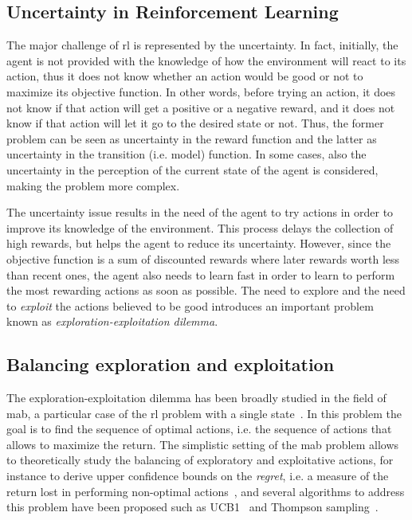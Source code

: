 \subsection{Uncertainty in Reinforcement Learning}
The major challenge of \gls{rl} is represented by the uncertainty. In fact, initially, the agent is not provided with the knowledge of how the environment will react to its action, thus it does not know whether an action would be good or not to maximize its objective function. In other words, before trying an action, it does not know if that action will get a positive or a negative reward, and it does not know if that action will let it go to the desired state or not. Thus, the former problem can be seen as uncertainty in the reward function and the latter as uncertainty in the transition (i.e. model) function. In some cases, also the uncertainty in the perception of the current state of the agent is considered, making the problem more complex.

The uncertainty issue results in the need of the agent to try actions in order to improve its knowledge of the environment. This process delays the collection of high rewards, but helps the agent to reduce its uncertainty. However, since the objective function is a sum of discounted rewards where later rewards worth less than recent ones, the agent also needs to learn fast in order to learn to perform the most rewarding actions as soon as possible. The need to explore and the need to \textit{exploit} the actions believed to be good introduces an important problem known as \textit{exploration-exploitation dilemma}.

\subsection{Balancing exploration and exploitation}
The exploration-exploitation dilemma has been broadly studied in the field of \gls{mab}, a particular case of the \gls{rl} problem with a single state~\cite{lai1985asymptotically}. In this problem the goal is to find the sequence of optimal actions, i.e. the sequence of actions that allows to maximize the return. The simplistic setting of the \gls{mab} problem allows to theoretically study the balancing of exploratory and exploitative actions, for instance to derive upper confidence bounds on the \textit{regret}, i.e. a measure of the return lost in performing non-optimal actions~\cite{bubeck2012regret, agrawal2012analysis, vermorel2005multi}, and several algorithms to address this problem have been proposed such as UCB1~\cite{auer2002finite} and Thompson sampling~\cite{thompson1933likelihood}.

